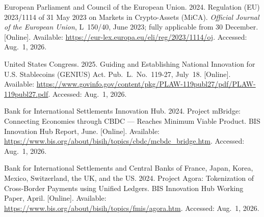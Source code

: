 {\begin{enumerate}[label={[\arabic*]}]

\item European Parliament and Council of the European Union. 2024. Regulation (EU) 2023/1114 of 31 May 2023 on Markets in Crypto-Assets (MiCA). \emph{Official Journal of the European Union}, L~150/40, June 2023; fully applicable from 30 December. [Online]. Available: \url{https://eur-lex.europa.eu/eli/reg/2023/1114/oj}. Accessed: Aug.~1, 2026.


\item United States Congress. 2025. Guiding and Establishing National Innovation for U.S. Stablecoins (GENIUS) Act. Pub.~L.~No.~119-27, July~18. [Online]. Available: \url{https://www.govinfo.gov/content/pkg/PLAW-119publ27/pdf/PLAW-119publ27.pdf}. Accessed: Aug.~1, 2026.

\item Bank for International Settlements Innovation Hub. 2024. Project mBridge: Connecting Economies through CBDC --- Reaches Minimum Viable Product. BIS Innovation Hub Report, June. [Online]. Available: \url{https://www.bis.org/about/bisih/topics/cbdc/mcbdc_bridge.htm}. Accessed: Aug.~1, 2026.

\item Bank for International Settlements and Central Banks of France, Japan, Korea, Mexico, Switzerland, the UK, and the US. 2024. Project Agora: Tokenization of Cross-Border Payments using Unified Ledgers. BIS Innovation Hub Working Paper, April. [Online]. Available: \url{https://www.bis.org/about/bisih/topics/fmis/agora.htm}. Accessed: Aug.~1, 2026.



\end{enumerate}}
